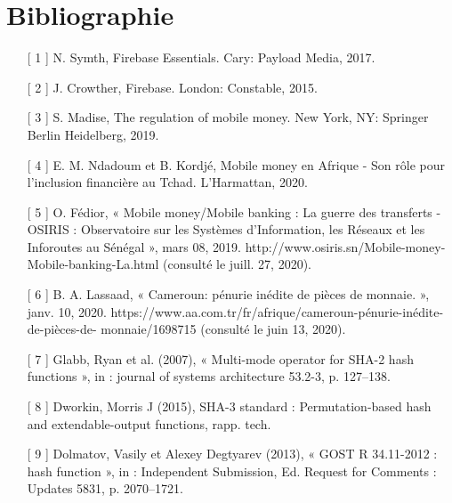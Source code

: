 \chapter*{Bibliographie}
\begin{enumerate}
	\item[[ 1]] N. Symth, Firebase Essentials. Cary: Payload Media, 2017.
	\item[[ 2]] J. Crowther, Firebase. London: Constable, 2015.
	\item[[ 3]] S. Madise, The regulation of mobile money. New York, NY: Springer Berlin Heidelberg,
	2019.
	\item[[ 4]] E. M. Ndadoum et B. Kordjé, Mobile money en Afrique - Son rôle pour l’inclusion
	financière au Tchad. L’Harmattan, 2020.
	\item[[ 5]] O. Fédior, « Mobile money/Mobile banking : La guerre des transferts - OSIRIS :
	Observatoire sur les Systèmes d’Information, les Réseaux et les Inforoutes au Sénégal »,
	mars 08, 2019. http://www.osiris.sn/Mobile-money-Mobile-banking-La.html (consulté le
	juill. 27, 2020).
	\item[[ 6]] B. A. Lassaad, « Cameroun: pénurie inédite de pièces de monnaie. », janv. 10, 2020.
	https://www.aa.com.tr/fr/afrique/cameroun-pénurie-inédite-de-pièces-de-
	monnaie/1698715 (consulté le juin 13, 2020).
	
	
	\item[[ 7]] Glabb, Ryan et al. (2007), « Multi-mode operator for SHA-2 hash functions », in : journal of
	systems architecture 53.2-3, p. 127–138.
	\item[[ 8]] Dworkin, Morris J (2015), SHA-3 standard : Permutation-based hash and extendable-output
	functions, rapp. tech.
	\item[[ 9]] Dolmatov, Vasily et Alexey Degtyarev (2013), « GOST R 34.11-2012 : hash function », in :
	Independent Submission, Ed. Request for Comments : Updates 5831, p. 2070–1721.
	
\end{enumerate}